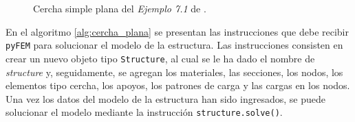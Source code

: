 \begin{figure}[t]
    \centering
    
    
    \caption{Cercha simple plana del \textit{Ejemplo 7.1} de \cite{escamilla1995microcomputadores}.}
    \label{fig:primer_punto}
\end{figure}

En el algoritmo \ref{alg:cercha_plana} se presentan las instrucciones que debe recibir \texttt{pyFEM} para solucionar el modelo de la estructura. Las instrucciones consisten en crear un nuevo objeto tipo \texttt{Structure}, al cual se le ha dado el nombre de \textit{structure} y, seguidamente, se agregan los materiales, las secciones, los nodos, los elementos tipo cercha, los apoyos, los patrones de carga y las cargas en los nodos. Una vez los datos del modelo de la estructura han sido ingresados, se puede solucionar el modelo mediante la instrucción \texttt{structure.solve()}. \\

